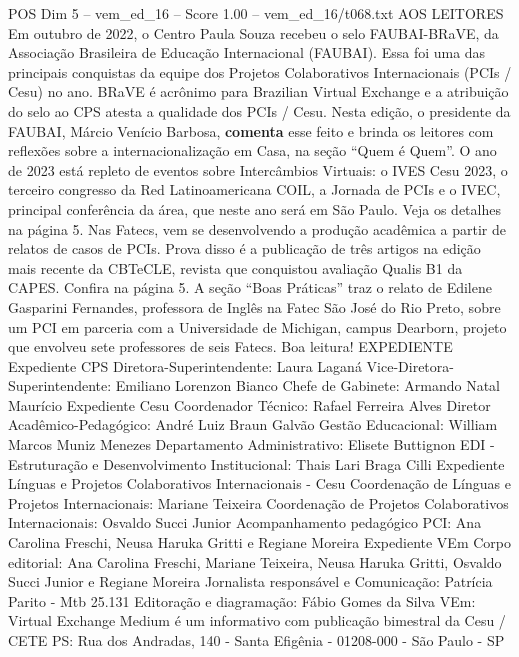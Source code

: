\begin{textsample}{POS Dim 5 – vem\_ed\_16 – Score 1.00 – vem\_ed\_16/t068.txt}  \label{ex:f5_pos_061}
AOS LEITORES Em outubro de 2022, o Centro Paula Souza recebeu o selo FAUBAI-BRaVE, da Associação Brasileira de Educação Internacional (FAUBAI).
Essa foi uma das principais conquistas da equipe dos Projetos Colaborativos Internacionais (PCIs / Cesu) no ano.
BRaVE é acrônimo para Brazilian Virtual Exchange e a atribuição do selo ao CPS atesta a qualidade dos PCIs / Cesu.
Nesta edição, o presidente da FAUBAI, Márcio Venício Barbosa, \textbf{comenta} esse feito e brinda os leitores com reflexões sobre a internacionalização em Casa, na seção “Quem é Quem”.
O ano de 2023 está repleto de eventos sobre Intercâmbios Virtuais: o IVES Cesu 2023, o terceiro congresso da Red Latinoamericana COIL, a Jornada de PCIs e o IVEC, principal conferência da área, que neste ano será em São Paulo.
Veja os detalhes na página 5.
Nas Fatecs, vem se desenvolvendo a produção acadêmica a partir de relatos de casos de PCIs.
Prova disso é a publicação de três artigos na edição mais recente da CBTeCLE, revista que conquistou avaliação Qualis B1 da CAPES.
Confira na página 5.
A seção “Boas Práticas” traz o relato de Edilene Gasparini Fernandes, professora de Inglês na Fatec São José do Rio Preto, sobre um PCI em parceria com a Universidade de Michigan, campus Dearborn, projeto que envolveu sete professores de seis Fatecs.
Boa leitura!
EXPEDIENTE Expediente CPS Diretora-Superintendente: Laura Laganá Vice-Diretora-Superintendente: Emiliano Lorenzon Bianco Chefe de Gabinete: Armando Natal Maurício Expediente Cesu Coordenador Técnico: Rafael Ferreira Alves Diretor Acadêmico-Pedagógico: André Luiz Braun Galvão Gestão Educacional: William Marcos Muniz Menezes Departamento Administrativo: Elisete Buttignon EDI - Estruturação e Desenvolvimento Institucional: Thais Lari Braga Cilli Expediente Línguas e Projetos Colaborativos Internacionais - Cesu Coordenação de Línguas e Projetos Internacionais: Mariane Teixeira Coordenação de Projetos Colaborativos Internacionais: Osvaldo Succi Junior Acompanhamento pedagógico PCI: Ana Carolina Freschi, Neusa Haruka Gritti e Regiane Moreira Expediente VEm Corpo editorial: Ana Carolina Freschi, Mariane Teixeira, Neusa Haruka Gritti, Osvaldo Succi Junior e Regiane Moreira Jornalista responsável e Comunicação: Patrícia Parito - Mtb 25.131 Editoração e diagramação: Fábio Gomes da Silva VEm: Virtual Exchange Medium é um informativo com publicação bimestral da Cesu / CETE PS: Rua dos Andradas, 140 - Santa Efigênia - 01208-000 - São Paulo - SP

\end{textsample}
